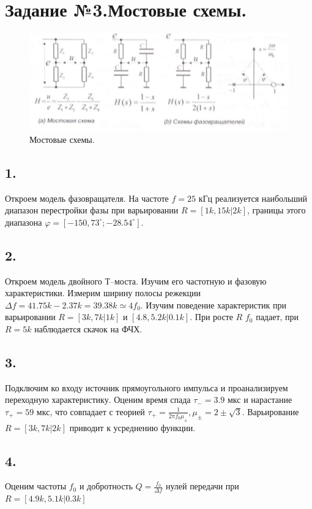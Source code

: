 \documentclass[a4paper, 12pt, twoside]{article}
\begin{document}
\newpage

\section*{Задание №3.Мостовые схемы.}

\begin{figure}[H]
	\includegraphics[width =  0.8\linewidth]{most}
	\caption{Мостовые схемы.}
	\label{RLC}
\end{figure}

\subsection*{1.} 
Откроем модель фазовращателя. На частоте $f=25$ кГц реализуется наибольший диапазон перестройки фазы при варьировании $R=[1k,15k|2k]$, границы этого диапазона $\varphi=[-150,73^\circ;-28.54^\circ]$. 

\subsection*{2.} 
Откроем модель двойного Т--моста. Изучим его частотную и фазовую характеристики. Измерим ширину полосы режекции $\Delta f=41.75k-2.37k=39.38k\simeq4f_0$. Изучим поведение характеристик при варьировании $R=[3k,7k|1k]$ и $[4.8,5.2k|0.1k]$. При росте $R$ $f_0$ падает, при $R=5k$ наблюдается скачок на ФЧХ. 

\subsection*{3.} 
Подключим ко входу источник прямоугольного импульса и проанализируем переходную характеристику. Оценим время спада $\tau_{-}=3.9$ мкс и нарастание $\tau_{+}=59$ мкс, что совпадает с теорией $\tau_{+}=\frac{1}{2\pi f_0 \mu_{\pm}},\mu_{\pm}=2\pm\sqrt{3}$. Варьирование $R=[3k,7k|2k]$ приводит к усреднению функции. 

\subsection*{4.} 
Оценим частоты $f_0$ и добротность $Q=\frac{f_0}{\Delta f}$ нулей передачи при $R=[4.9k,5.1k|0.3k]$ 
\end{document}
